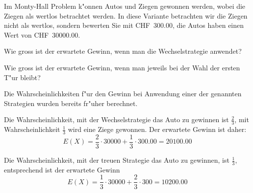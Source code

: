 Im Monty-Hall Problem k"onnen Autos und Ziegen gewonnen werden, wobei
die Ziegen als wertlos betrachtet werden. In diese Variante betrachten
wir die Ziegen nicht als wertlos, sondern bewerten Sie mit CHF~300.00,
die Autos haben einen Wert von CHF~30000.00.
\begin{teilaufgaben}
\item Wie gross ist der erwartete Gewinn, wenn man die Wechselstrategie
anwendet?
\item Wie gross ist der erwartete Gewinn, wenn man jeweils bei der Wahl
der ersten T"ur bleibt?
\end{teilaufgaben}

\begin{loesung}
Die Wahrscheinlichkeiten f"ur den Gewinn bei Anwendung einer der
genannten Strategien wurden bereits fr"uher berechnet.
\begin{teilaufgaben}
\item
Die Wahrscheinlichkeit, mit der Wechselstrategie das Auto zu gewinnen
ist $\frac23$, mit Wahrscheinlichkeit $\frac13$ wird eine Ziege gewonnen.
Der erwartete Gewinn ist daher:
\[
E(X)=\frac23\cdot 30000+\frac13\cdot 300.00=20100.00
\]
\item
Die Wahrscheinlichkeit, mit der treuen Strategie das Auto zu
gewinnen, ist $\frac13$, entsprechend ist der erwartete Gewinn
\[
E(X)=\frac13\cdot 30000+\frac23\cdot 300=10200.00
\]
\end{teilaufgaben}
\end{loesung}


